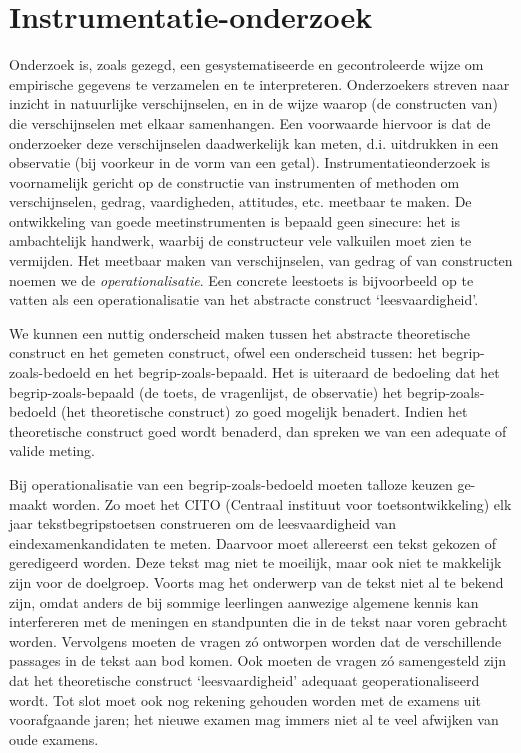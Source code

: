 \documentclass[
]{book}
\begin{document}
\hypertarget{sec:instrumentatie-onderzoek}{%
\section{Instrumentatie-onderzoek}\label{sec:instrumentatie-onderzoek}}

Onderzoek is, zoals gezegd, een gesystematiseerde en gecontroleerde
wijze om empirische gegevens te verzamelen en te interpreteren.
Onderzoekers streven naar inzicht in natuurlijke verschijnselen, en in
de wijze waarop (de constructen van) die verschijnselen met elkaar
samenhangen. Een voorwaarde hiervoor is dat de onderzoeker deze
verschijnselen daadwerkelijk kan meten, d.i. uitdrukken in een
observatie (bij voorkeur in de vorm van een getal).
Instrumentatieonderzoek is voornamelijk gericht op de constructie van
instrumenten of methoden om verschijnselen, gedrag, vaardigheden,
attitudes, etc. meetbaar te maken. De ontwikkeling van goede
meetinstrumenten is bepaald geen sinecure: het is ambachtelijk handwerk,
waarbij de constructeur vele valkuilen moet zien te vermijden. Het
meetbaar maken van verschijnselen, van gedrag of van constructen noemen
we de \emph{operationalisatie}. Een concrete leestoets is bijvoorbeeld op te
vatten als een operationalisatie van het abstracte construct
`leesvaardigheid'.

We kunnen een nuttig onderscheid maken tussen het abstracte theoretische
construct en het gemeten construct, ofwel een onderscheid tussen: het
begrip-zoals-bedoeld en het begrip-zoals-bepaald. Het is uiteraard de
bedoeling dat het begrip-zoals-bepaald (de toets, de vragenlijst, de
observatie) het begrip-zoals-bedoeld (het theoretische construct) zo
goed mogelijk benadert. Indien het theoretische construct goed wordt
benaderd, dan spreken we van een adequate of valide meting.

Bij operationalisatie van een begrip-zoals-bedoeld moeten talloze keuzen
ge-maakt worden. Zo moet het CITO (Centraal instituut voor
toetsontwikkeling) elk jaar tekstbegripstoetsen construeren om de
leesvaardigheid van eindexamenkandidaten te meten. Daarvoor moet
allereerst een tekst gekozen of geredigeerd worden. Deze tekst mag niet
te moeilijk, maar ook niet te makkelijk zijn voor de doelgroep. Voorts
mag het onderwerp van de tekst niet al te bekend zijn, omdat anders de
bij sommige leerlingen aanwezige algemene kennis kan interfereren met de
meningen en standpunten die in de tekst naar voren gebracht worden.
Vervolgens moeten de vragen zó ontworpen worden dat de verschillende
passages in de tekst aan bod komen. Ook moeten de vragen zó samengesteld
zijn dat het theoretische construct `leesvaardigheid' adequaat
geoperationaliseerd wordt. Tot slot moet ook nog rekening gehouden
worden met de examens uit voorafgaande jaren; het nieuwe examen mag
immers niet al te veel afwijken van oude examens.
\end{document}
